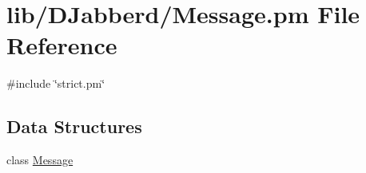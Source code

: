 \hypertarget{_message_8pm}{
\section{lib/\-D\-Jabberd/\-Message.pm \-File \-Reference}
\label{_message_8pm}
}
{\ttfamily \#include \char`\"{}strict.\-pm\char`\"{}}\*
\subsection*{\-Data \-Structures}
\begin{DoxyCompactItemize}
\item 
class \hyperlink{class_d_jabberd_1_1_message}{\-Message}
\end{DoxyCompactItemize}
